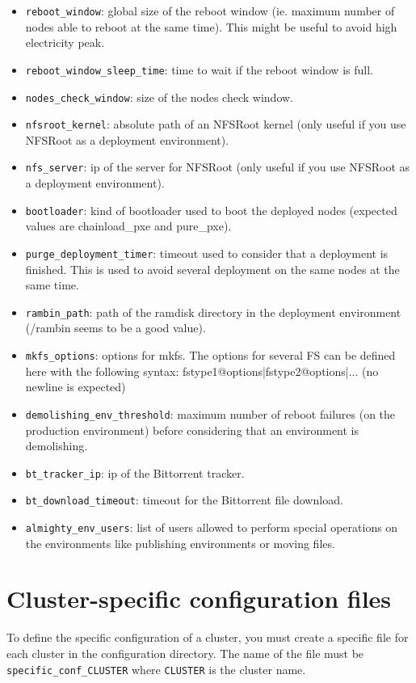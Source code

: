 \documentclass[a4wide,10pt,oneside]{book}
\begin{document}
\begin{itemize}
\item \texttt{reboot\_window}: global size of the reboot window (ie. maximum number of nodes able to reboot at the same time). This might be useful to avoid high electricity peak.
\item \texttt{reboot\_window\_sleep\_time}: time to wait if the reboot window is full.
\item \texttt{nodes\_check\_window}: size of the nodes check window.
\item \texttt{nfsroot\_kernel}: absolute path of an NFSRoot kernel (only useful if you use NFSRoot as a deployment environment).
\item \texttt{nfs\_server}: ip of the server for NFSRoot (only useful if you use NFSRoot as a deployment environment).
\item \texttt{bootloader}: kind of bootloader used to boot the deployed nodes (expected values are chainload\_pxe and pure\_pxe).
\item \texttt{purge\_deployment\_timer}: timeout used to consider that a deployment is finished. This is used to avoid several deployment on the same nodes at the same time.
\item \texttt{rambin\_path}: path of the ramdisk directory in the deployment environment (/rambin seems to be a good value).
\item \texttt{mkfs\_options}: options for mkfs. The options for several FS can be defined here with the following syntax: fstype1@options|fstype2@options|... (no newline is expected)
\item \texttt{demolishing\_env\_threshold}: maximum number of reboot failures (on the production environment) before considering that an environment is demolishing.
\item \texttt{bt\_tracker\_ip}: ip of the Bittorrent tracker.
\item \texttt{bt\_download\_timeout}: timeout for the Bittorrent file download.
\item \texttt{almighty\_env\_users}: list of users allowed to perform special operations on the environments like publishing environments or moving files.
\end{itemize}

\section{Cluster-specific configuration files}\label{sec:specific_config}
To define the specific configuration of a cluster, you must create a specific file for each cluster in the configuration directory. The name of the file must be \texttt{specific\_conf\_CLUSTER} where \texttt{CLUSTER} is the cluster name.
\end{document}
